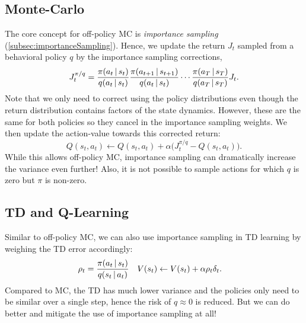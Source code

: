 		\subsection{Monte-Carlo}
			The core concept for off-policy \ac{MC} is \emph{importance sampling} (\autoref{subsec:importanceSampling}). Hence, we update the return \(J_t\) sampled from a behavioral policy \(q\) by the importance sampling corrections,
			\begin{equation}
				J_t^{\pi/q} = \frac{\pi(a_t \,\vert\, s_t)}{q(a_t \,\vert\, s_t)} \frac{\pi(a_{t + 1} \,\vert\, s_{t + 1})}{q(a_t \,\vert\, s_t)} \cdots \frac{\pi(a_T \,\vert\, s_T)}{q(a_T \,\vert\, s_T)} J_t.
			\end{equation}
			Note that we only need to correct using the policy distributions even though the return distribution contains factors of the state dynamics. However, these are the same for both policies so they cancel in the importance sampling weights. We then update the action-value towards this corrected return:
			\begin{equation}
				Q(s_t, a_t) \gets Q(s_t, a_t) + \alpha \bigl( J_t^{\pi/q} - Q(s_t, a_t) \bigr).
			\end{equation}
			While this allows off-policy \ac{MC}, importance sampling can dramatically increase the variance even further! Also, it is not possible to sample actions for which \(q\) is zero but \(\pi\) is non-zero.

		\subsection{\acs{TD} and Q-Learning}
			Similar to off-policy \ac{MC}, we can also use importance sampling in \ac{TD} learning by weighing the \ac{TD} error accordingly:
			\begin{align}
				\rho_t &= \frac{\pi(a_t \,\vert\, s_t)}{q(s_t \,\vert\, a_t)} &
				V(s_t) &\gets V(s_t) + \alpha \rho_t \delta_t.
			\end{align}
			Compared to \ac{MC}, the \ac{TD} has much lower variance and the policies only need to be similar over a single step, hence the risk of \(q \approx 0\) is reduced. But we can do better and mitigate the use of importance sampling at all!

